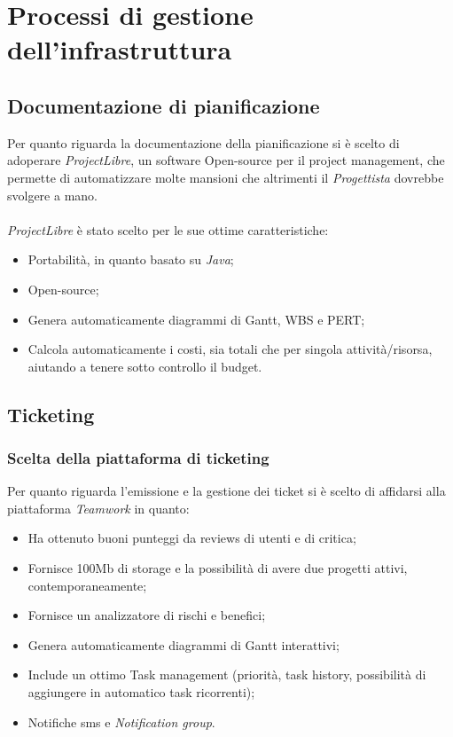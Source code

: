 \documentclass[a4paper]{report}
\begin{document}
	\section{Processi di gestione dell'infrastruttura}
	\subsection{Documentazione di pianificazione}
		Per quanto riguarda la documentazione della pianificazione si è scelto di adoperare
		\emph{ProjectLibre}, un software Open-source per il project management, che permette
		di automatizzare molte mansioni che altrimenti il \emph{Progettista} dovrebbe svolgere
		a mano. \\ \\
		\emph{ProjectLibre} è stato scelto per le sue ottime caratteristiche:
		\begin{itemize}
			\item Portabilità, in quanto basato su \emph{Java};
			\item Open-source;
			\item Genera automaticamente diagrammi di Gantt, WBS e PERT;
			\item Calcola automaticamente i costi, sia totali che per singola attività/risorsa, 
			aiutando a tenere sotto controllo il budget.
		\end{itemize}
	\subsection{Ticketing}	
	\subsubsection{Scelta della piattaforma di ticketing}
	Per quanto riguarda l'emissione e la gestione dei ticket si è scelto di affidarsi alla piattaforma \emph{Teamwork}
	in quanto:
	\begin{itemize}
		\item Ha ottenuto buoni punteggi da reviews di utenti e di critica;
		\item Fornisce 100Mb di storage e la possibilità di avere due progetti attivi, contemporaneamente;
		\item Fornisce un analizzatore di rischi e benefici;
		\item Genera automaticamente diagrammi di Gantt interattivi;
		\item Include un ottimo Task management (priorità, task history, possibilità di aggiungere in automatico task ricorrenti);
		\item Notifiche sms e \emph{Notification group}.
	\end{itemize}
	
\end{document}
